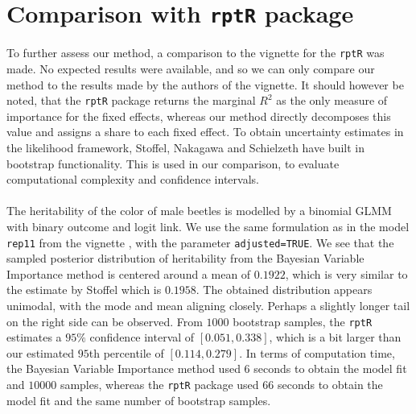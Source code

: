 \section{Comparison with \texttt{rptR} package}
To further assess our method, a comparison to the vignette for the \texttt{rptR} was made. No expected results were available, and so we can only compare our method to the results made by the authors of the vignette. It should however be noted, that the \texttt{rptR} package returns the marginal $R^2$ as the only measure of importance for the fixed effects, whereas our method directly decomposes this value and assigns a share to each fixed effect. To obtain uncertainty estimates in the likelihood framework, Stoffel, Nakagawa and Schielzeth have built in bootstrap functionality. This is used in our comparison, to evaluate computational complexity and confidence intervals.
\\
\\
The heritability of the color of male beetles is modelled by a binomial GLMM with binary outcome and logit link. We use the same formulation as in the model \texttt{rep11} from the vignette \citep{Stoffel2017rptR}, with the parameter \texttt{adjusted=TRUE}. We see that the sampled posterior distribution of heritability  from the Bayesian Variable Importance method is centered around a mean of $0.1922$, which is very similar to the estimate by Stoffel which is $0.1958$. The obtained distribution appears unimodal, with the mode and mean aligning closely. Perhaps a slightly longer tail on the right side can be observed. From $1000$ bootstrap samples, the \texttt{rptR} estimates a $95\%$ confidence interval of $[0.051, 0.338]$, which is a bit larger than our estimated $95$th percentile of $[0.114, 0.279]$. In terms of computation time, the Bayesian Variable Importance method used $6$ seconds to obtain the model fit and $10000$ samples, whereas the \texttt{rptR} package used $66$ seconds to obtain the model fit and the same number of bootstrap samples.
